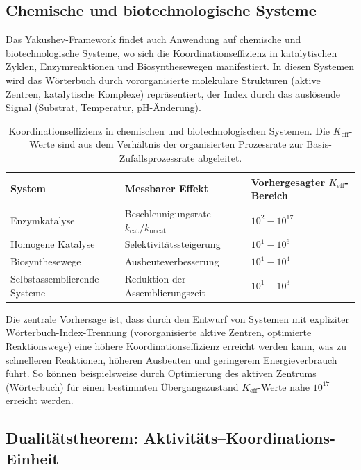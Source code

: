 \documentclass[11pt,a4paper]{article}
\begin{document}
	\subsection{Chemische und biotechnologische Systeme}
	\label{subsec:chemical-systems}
	
	Das Yakushev-Framework findet auch Anwendung auf chemische und biotechnologische Systeme, wo sich die Koordinationseffizienz in katalytischen Zyklen, Enzymreaktionen und Biosynthesewegen manifestiert. In diesen Systemen wird das Wörterbuch durch vororganisierte molekulare Strukturen (aktive Zentren, katalytische Komplexe) repräsentiert, der Index durch das auslösende Signal (Substrat, Temperatur, pH-Änderung).
	
	\begin{table}[htbp]
		\centering
		\small
		\begin{tabular}{p{}p{}p{}}
			\toprule
			\textbf{System} & \textbf{Messbarer Effekt} & \textbf{Vorhergesagter $K_{\mathrm{eff}}$-Bereich} \\
			\midrule
			Enzymkatalyse & Beschleunigungsrate $k_{\text{cat}}/k_{\text{uncat}}$ & $10^2 - 10^{17}$ \\
			Homogene Katalyse & Selektivitätssteigerung & $10^1 - 10^6$ \\
			Biosynthesewege & Ausbeuteverbesserung & $10^1 - 10^4$ \\
			Selbstassemblierende Systeme & Reduktion der Assemblierungszeit & $10^1 - 10^3$ \\
			\bottomrule
		\end{tabular}
		\caption{Koordinationseffizienz in chemischen und biotechnologischen Systemen. Die $K_{\mathrm{eff}}$-Werte sind aus dem Verhältnis der organisierten Prozessrate zur Basis-Zufallsprozessrate abgeleitet.}
		\label{tab:chemical-keff}
	\end{table}
	
	Die zentrale Vorhersage ist, dass durch den Entwurf von Systemen mit expliziter Wörterbuch-Index-Trennung (vororganisierte aktive Zentren, optimierte Reaktionswege) eine höhere Koordinationseffizienz erreicht werden kann, was zu schnelleren Reaktionen, höheren Ausbeuten und geringerem Energieverbrauch führt. So können beispielsweise durch Optimierung des aktiven Zentrums (Wörterbuch) für einen bestimmten Übergangszustand $K_{\mathrm{eff}}$-Werte nahe $10^{17}$ erreicht werden.
	
	\subsection{Dualitätstheorem: Aktivitäts–Koordinations-Einheit}
	
\end{document}
